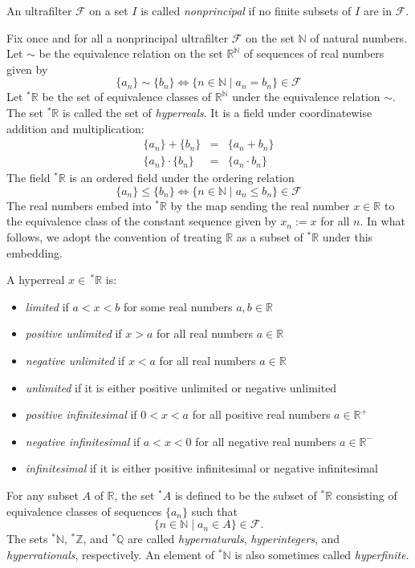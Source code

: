 \documentclass[12pt]{article}
\newcommand{\F}{\mathcal{F}}
\newcommand{\R}{\mathbb{R}}
\newcommand{\N}{\mathbb{N}}
\begin{document}
An ultrafilter $\F$ on a set $I$ is called {\em nonprincipal} if no finite subsets of $I$ are in $\F$.

Fix once and for all a nonprincipal ultrafilter $\F$ on the set $\N$ of natural numbers. Let $\sim$ be the equivalence relation on the set $\R^\N$ of sequences of real numbers given by
$$
\{a_n\} \sim \{b_n\} \iff \{n \in \N \mid a_n = b_n\} \in \F
$$
Let $^*\R$ be the set of equivalence classes of $\R^\N$ under the equivalence relation $\sim$. The set $^*\R$ is called the set of {\em hyperreals}. It is a field under coordinatewise addition and multiplication:
\begin{eqnarray*}
\{a_n\} + \{b_n\} & = & \{a_n+b_n\} \\
\{a_n\} \cdot \{b_n\} & = & \{a_n\cdot b_n\}
\end{eqnarray*}
The field $^*\R$ is an ordered field under the ordering relation
$$
\{a_n\} \leq \{b_n\} \iff \{n \in \N \mid a_n \leq b_n\} \in \F
$$
The real numbers embed into $^*\R$ by the map sending the real number $x \in \R$ to the equivalence class of the constant sequence given by $x_n := x$ for all $n$. In what follows, we adopt the convention of treating $\R$ as a subset of $^*\R$ under this embedding.

A hyperreal $x \in\,^*\R$ is:
\begin{itemize}
\item {\em limited} if $a < x < b$ for some real numbers $a,b \in \R$
\item {\em positive unlimited} if $x > a$ for all real numbers $a \in \R$
\item {\em negative unlimited} if $x < a$ for all real numbers $a \in \R$
\item {\em unlimited} if it is either positive unlimited or negative unlimited
\item {\em positive infinitesimal} if $0 < x < a$ for all positive real numbers $a \in \R^+$
\item {\em negative infinitesimal} if $a < x < 0$ for all negative real numbers $a \in \R^-$
\item {\em infinitesimal} if it is either positive infinitesimal or negative infinitesimal
\end{itemize}

For any subset $A$ of $\R$, the set $^*A$ is defined to be the subset of $^*\R$ consisting of equivalence classes of sequences $\{a_n\}$ such that
$$
\{n \in \N \mid a_n \in A\} \in \F.
$$
The sets $^*\mathbb{N}$, $^*\mathbb{Z}$, and $^*\mathbb{Q}$ are called {\em hypernaturals}, {\em hyperintegers}, and {\em hyperrationals}, respectively. An element of $^*\mathbb{N}$ is also sometimes called {\em hyperfinite}.
\end{document}
